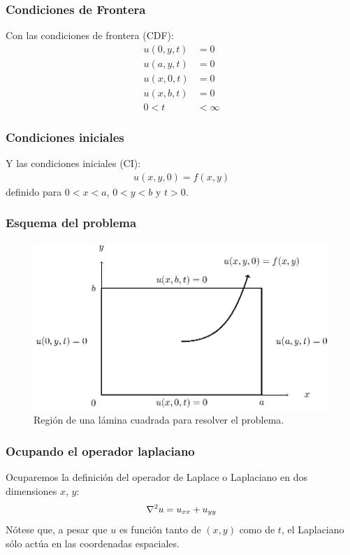 \documentclass[12pt]{beamer}
\begin{document}
\begin{frame}
\frametitle{Condiciones de Frontera}
Con las condiciones de frontera (CDF):
\begin{align}
u(0, y, t) &= 0 \label{eq:ecuacion_02_188} \\
u(a, y, t) &= 0 \label{eq:ecuacion_02_189} \\
u(x, 0, t) &= 0 \label{eq:ecuacion_02_190} \\
u(x, b, t) &= 0 \label{eq:ecuacion_02_191} \\
0 < t &< \infty \nonumber
\end{align}
\end{frame}
\begin{frame}
\frametitle{Condiciones iniciales}
Y las condiciones iniciales (CI):
\begin{align}
u(x, y, 0) = f (x, y) \label{eq:ecuacion_02_192}
\end{align}
definido para $0 < x < a$, $0  < y < b$ y $t > 0$.
\end{frame}
\begin{frame}
\frametitle{Esquema del problema}
\begin{figure}[H]
    \centering
    \includegraphics[scale=0.9]{Imagenes/Separacion_Variables_01_Lamina_Cuad.eps}
    \caption{Región de una lámina cuadrada para resolver el problema.}
    \label{fig:figura_lamina_cuadrada}
\end{figure}
\end{frame}
\begin{frame}
\frametitle{Ocupando el operador laplaciano}
Ocuparemos la definición del operador de Laplace o Laplaciano en dos dimensiones $x$, $y$:
\begin{align}
\laplacian{u} = u_{xx} + u_{yy}
\label{eq:ecuacion_02_193}
\end{align}
Nótese que, a pesar que $u$ es función tanto de $(x, y) $ como de $t$, el Laplaciano sólo actúa en las coordenadas espaciales.
\end{frame}
\end{document}
